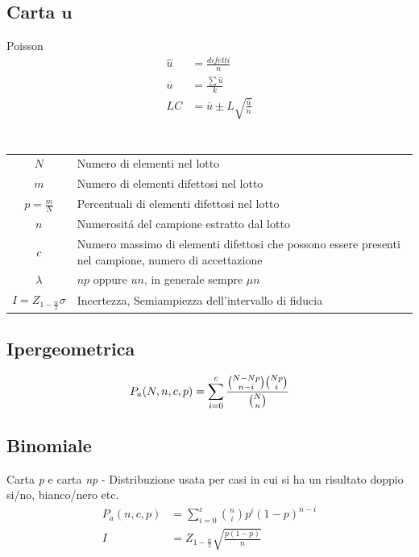 \documentclass[fontsize=8pt]{scrartcl}
\newcommand{\mysection}[1]{
    \setlength\fboxsep{4pt} %
    \section*{\colorbox{black}{\makebox[\linewidth][l]{\color{white}#1\hfill}}}
}
\begin{document}
\begin{multicols*}{2}
\subsection*{Carta \(\mathbf{u}\)}
Poisson
\begin{align*}
    \widehat{u} &= \frac{difetti}{n}\\
    \overline{u}&=\frac{\sum \widehat{u}}{k}\\
    LC &= \overline{u} \pm L\sqrt{\frac{\overline{u}}{n}}    
\end{align*}

\mysection{DISTRIBUZIONI}

\begin{center}
    \begin{tabularx}{\linewidth}{c X}
        \(N\)             & Numero di elementi nel lotto\\
        \(m\)             & Numero di elementi difettosi nel lotto\\
        \(p=\frac{m}{N}\) & Percentuali di elementi difettosi nel lotto\\
        \(n\)             & Numerositá del campione estratto dal lotto\\
        \(c\)             & Numero massimo di elementi difettosi che possono essere presenti nel campione, numero di accettazione\\
        \(\lambda\)       & \(np\) oppure \(un\), in generale sempre \(\mu n\)\\
        \(I = Z_{1-\frac{\alpha}{2}}\sigma\) & Incertezza, Semiampiezza dell'intervallo di fiducia
    \end{tabularx}
\end{center}

\subsection*{Ipergeometrica}
\begin{equation*}
    P_a(N,n,c,p)=\sum_{i=0}^c\frac{\binom{N-Np}{n-i} \binom{Np}{i}}{\binom{N}{n}}\\
\end{equation*}

\subsection*{Binomiale}
Carta \textit{p} e carta \textit{np} - Distribuzione usata per casi in cui si ha un risultato doppio si/no, bianco/nero etc.
\begin{align*}
    P_a(n,c,p)&=\sum_{i=0}^c\binom{n}{i}p^i(1-p)^{n-i}\\
    I &= Z_{1-\frac{\alpha}{2}}\sqrt{\frac{p(1-p)}{n}}
\end{align*}


\end{multicols*}
\end{document}

